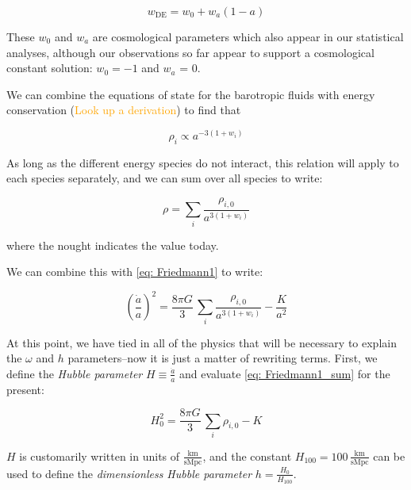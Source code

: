 \begin{equation}
w_\text{DE} = w_0 + w_a (1 - a)
\end{equation}

These $w_0$ and $w_a$ are cosmological parameters which also appear in our
statistical analyses, although our observations so far appear to support
a cosmological constant solution: $w_0 = -1$ and $w_a$ = 0.

We can combine the equations of state for the barotropic fluids with energy 
conservation (\textcolor{orange}{Look up a derivation}) to find that

\begin{equation}
\rho_i \propto a^{-3 (1 + w_i)}
\end{equation}

As long as the different energy species do not interact, this relation will
apply to each species separately, and we can sum over all species to write:

\begin{equation}
\rho = \sum_i \frac{\rho_{i, 0}}{a^{3(1 + w_i)}}
\end{equation}

where the nought indicates the value today.

We can combine this with \ref{eq: Friedmann1} to write:

\begin{equation}
\label{eq: Friedmann1_sum}
\left( \frac{\dot{a}}{a} \right)^2
=
\frac{8 \pi G}{3} \, \sum_i \frac{\rho_{i, 0}}{a^{3(1 + w_i)}} - \frac{K}{a^2}
\end{equation}


At this point, we have tied in all of the physics that will be necessary to
explain the $\omega$ and $h$ parameters--now it is just a matter of rewriting 
terms. First, we define the \textit{Hubble parameter}
$H \equiv \frac{\dot{a}}{a}$ and evaluate \ref{eq: Friedmann1_sum}
for the present:

\begin{equation}
\label{eq: Friedmann1_present}
H_0^2 = \frac{8 \pi G}{3} \, \sum_i \rho_{i, 0} - K
\end{equation}

$H$ is customarily written in units of
$\frac{\mathrm{km}}{\mathrm{s} \mathrm{Mpc}}$, and the constant
$H_{100} = 100 \, \frac{\mathrm{km}}{\mathrm{s} \mathrm{Mpc}}$ can be used to
define the \textit{dimensionless Hubble parameter} $h = \frac{H_0}{H_{100}}$.

